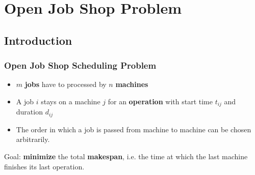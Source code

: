 \section{Open Job Shop Problem}

\subsection{Introduction}



\begin{frame}
  \frametitle{Open Job Shop Scheduling Problem}

  \begin{itemize}
    \item $m$ \textbf{jobs} have to processed by $n$ \textbf{machines}
    \item A job $i$ stays on a machine $j$ for an \textbf{operation} with start time $t_{ij}$ and duration $d_{ij}$
    \item The order in which a job is passed from machine to machine can be chosen arbitrarily.
  \end{itemize}

  Goal: \textbf{minimize} the total \textbf{makespan}, i.e. the time at which the last machine finishes its last operation.

 	

\end{frame}


